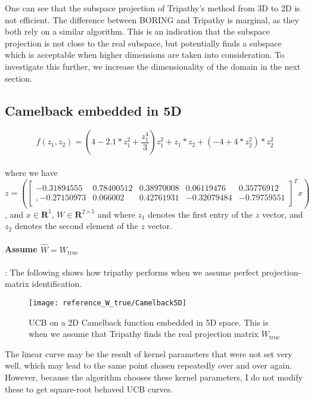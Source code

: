 One can see that the subspace projection of Tripathy's method from 3D to 2D is not efficient. 
The difference between BORING and Tripathy is marginal, as they both rely on a similar algorithm.
This is an indication that the subspace projection is not close to the real subspace, but potentially finds a subspace which is acceptable when higher dimensions are taken into consideration.
To investigate this further, we increase the dimensionality of the domain in the next section.

\subsection{Camelback embedded in 5D}

\def\WCamelback5D{
\begin{bmatrix}
     -0.31894555 & 0.78400512 & 0.38970008 & 0.06119476 & 0.35776912 \\,
     -0.27150973 & 0.066002 & 0.42761931 & -0.32079484 &-0.79759551
\end{bmatrix}}

\begin{equation}
f(z_1, z_2) = \left( 4 - 2.1 * z_1^2 + \frac{z_1^4}{3} \right)  z_1^2 + z_1 *  z_2 + \left(-4 + 4 * z_2^2 \right) * z_2^2
\end{equation} \\

where we have \\
$z = \left( \WCamelback5D^T x \right) $, and $ x \in \mathbf{R}^5$, $W \in \mathbf{R}^{2 \times 5}$
and where $z_1$ denotes the first entry of the $z$ vector, and $z_2$ denotes the second element of the $z$ vector.

\paragraph{Assume $\hat{W} = W_{\text{true}}$}: The following shows how tripathy performs when we assume perfect projection-matrix identification.

\begin{figure}[H]
  \centering
      \texttt{[image: reference\_W\_true/Camelback5D]}
  \caption{UCB on a 2D Camelback function embedded in 5D space.
  This is when we assume that Tripathy finds the real projection matrix $W_{\text{true}}$}
\end{figure}

The linear curve may be the result of kernel parameters that were not set very well, which may lead to the same point chosen repeatedly over and over again.
However, because the algorithm chooses these kernel parameters, I do not modify these to get square-root behaved UCB curves.

